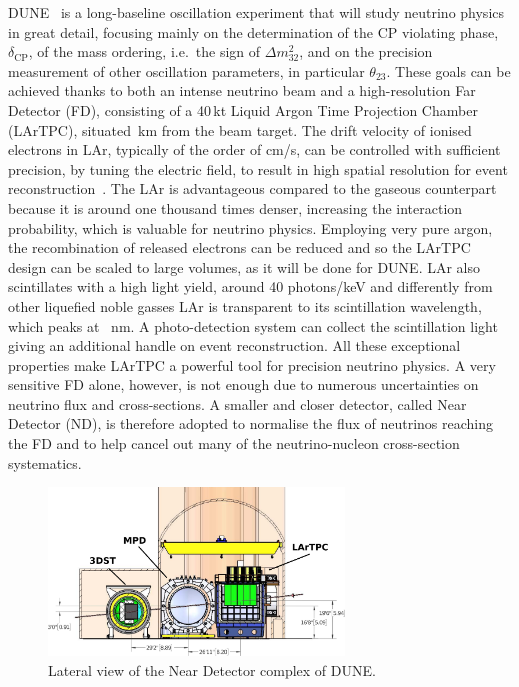 DUNE~\cite{Abi:2018dnh} is a long-baseline oscillation experiment that %
will study neutrino physics in great detail, focusing mainly on the determination %
of the CP violating phase, $\delta_\text{CP}$, of the mass ordering, i.e.\ the sign of $\Delta m_{32}^2$, %
and on the precision measurement of other oscillation parameters, in particular $\theta_{23}$.
These goals can be achieved thanks to both an intense neutrino beam and a high-resolution Far Detector (FD), %
consisting of a 40\,kt Liquid Argon Time Projection Chamber (LArTPC), situated \,km from the beam target.
The drift velocity of ionised electrons in LAr, typically of the order of cm/\textmu s, %
can be controlled with sufficient precision, by tuning the electric field, %
to result in high spatial resolution for event reconstruction~\cite{Rubbia:1977zz}.
The LAr is advantageous compared to the gaseous counterpart because it is around one thousand times denser, %
increasing the interaction probability, which is valuable for neutrino physics.
Employing very pure argon, the recombination of released electrons can be reduced and %
so the LArTPC design can be scaled to large volumes, as it will be done for DUNE.
LAr also scintillates with a high light yield, around 40 photons/keV and differently from other %
liquefied noble gasses LAr is transparent to its scintillation wavelength, which peaks at ~nm.
A photo-detection system can collect the scintillation light giving an additional handle on event reconstruction.
All these exceptional properties make LArTPC a powerful tool for precision neutrino physics.
A very sensitive FD alone, however, is not enough due to numerous uncertainties on neutrino flux and cross-sections.
A smaller and closer detector, called Near Detector (ND), is therefore adopted to normalise %
the flux of neutrinos reaching the FD and to help cancel out many of the neutrino-nucleon cross-section systematics.

\begin{figure}
	\centering
	\includegraphics[width=0.7\textwidth]{pics/duneND.png}
	\caption{Lateral view of the Near Detector complex of DUNE.}
	\label{fig:duneND}
\end{figure}

